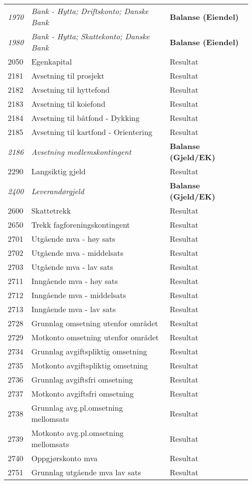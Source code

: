\begin{longtable}{l l l}
\emph{1970} & \emph{Bank - Hytta; Driftskonto; Danske Bank} & {\bfseries Balanse (Eiendel)}\\
\emph{1980} & \emph{Bank - Hytta; Skattekonto; Danske Bank} & {\bfseries Balanse (Eiendel)}\\
2050 & Egenkapital & Resultat\\
2181 & Avsetning til prosjekt & Resultat\\
2182 & Avsetning til hyttefond & Resultat\\
2183 & Avsetning til koiefond & Resultat\\
2184 & Avsetning til båtfond - Dykking & Resultat\\
2185 & Avsetning til kartfond - Orientering & Resultat\\
\emph{2186} & \emph{Avsetning medlemskontingent} & {\bfseries Balanse (Gjeld/EK)}\\
2290 & Langsiktig gjeld & Resultat\\
\emph{2400} & \emph{Leverandørgjeld} & {\bfseries Balanse (Gjeld/EK)}\\
2600 & Skattetrekk & Resultat\\
2650 & Trekk fagforeningskontingent & Resultat\\
2701 & Utgående mva - høy sats & Resultat\\
2702 & Utgående mva - middelsats & Resultat\\
2703 & Utgående mva - lav sats & Resultat\\
2711 & Inngående mva - høy sats & Resultat\\
2712 & Inngående mva - middelsats & Resultat\\
2713 & Inngående mva - lav sats & Resultat\\
2728 & Grunnlag omsetning utenfor området & Resultat\\
2729 & Motkonto omsetning utenfor området & Resultat\\
2734 & Grunnlag avgiftspliktig omsetning & Resultat\\
2735 & Motkonto avgiftspliktig omsetning & Resultat\\
2736 & Grunnlag avgiftsfri omsetning & Resultat\\
2737 & Motkonto avgiftsfri omsetning & Resultat\\
2738 & Grunnlag avg.pl.omsetning mellomsats & Resultat\\
2739 & Motkonto avg.pl.omsetning mellomsats & Resultat\\
2740 & Oppgjørskonto mva & Resultat\\
2751 & Grunnlag utgående mva lav sats & Resultat\\

\end{longtable}
